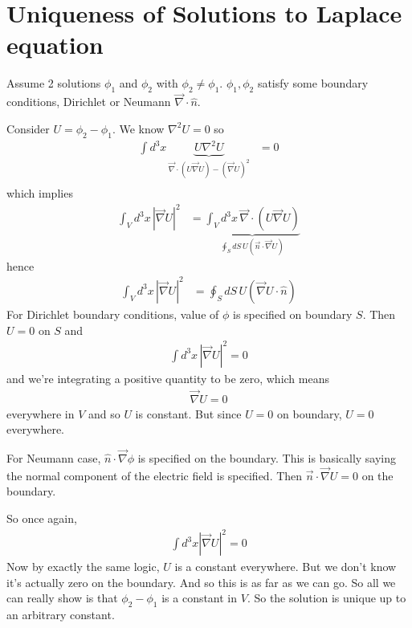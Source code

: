 \section{Uniqueness of Solutions to Laplace equation}
Assume 2 solutions $\phi_1$ and $\phi_2$ with
$\phi_2\ne \phi_1$.
$\phi_1,\phi_2$ satisfy some boundary conditions,
Dirichlet or Neumann
$\vec{\nabla}\cdot\hat{n}$.

Consider $U=\phi_2 - \phi_1$.
We know $\nabla^2 U=0$ so
\begin{align}
    \int d^3x\,
    \underbrace{
    U \nabla^2 U
    }_{
    \vec{\nabla}\cdot\left( U\vec{\nabla} U \right)
    -
    \left( \vec{\nabla} U \right)^2
    }
    &=0\\
\end{align}
which implies
\begin{align}
    \int_V d^3x\,
    |\vec{\nabla} U|^2
    &=
    \underbrace{
    \int_V d^3x\, \vec{\nabla}\cdot\left( U\vec{\nabla}U \right)
    }_{
    \oint_S dS\, U\left( \vec{n}\cdot\vec{\nabla}U \right)
    }
\end{align}
hence
\begin{align}
    \int_V d^3x\, |\vec{\nabla}U|^2
    &=
    \oint_S dS\, U\left( \vec{\nabla} U\cdot\hat{n} \right)
\end{align}
For Dirichlet boundary conditions,
value of $\phi$ is specified on boundary $S$.
Then $U=0$ on $S$
and
\begin{align}
    \int d^3x\,
    |\vec{\nabla}U|^2 = 0
\end{align}
and we're integrating a positive quantity to be zero,
which means
\begin{align}
    \vec{\nabla}U = 0
\end{align}
everywhere in $V$
and so $U$ is constant.
But since $U=0$ on boundary,
$U=0$ everywhere.

For Neumann case,
$\hat{n}\cdot\vec{\nabla}\phi$ is specified on the boundary.
This is basically saying the normal component of the electric field is
specified.
Then $\vec{n}\cdot\vec{\nabla}U=0$
on the boundary.

So once again,
\begin{align}
    \int d^3x \left| \vec{\nabla} U\right|^2 = 0
\end{align}
Now by exactly the same logic,
$U$ is a constant everywhere.
But we don't know it's actually zero on the boundary.
And so this is as far as we can go.
So all we can really show is that
$\phi_2 - \phi_1$
is a constant in $V$.
So the solution is unique up to an arbitrary constant.

